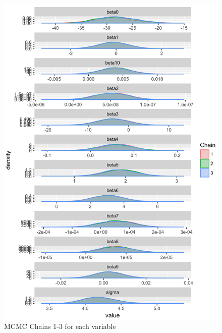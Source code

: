 \documentclass[12pt,english]{article}
\begin{document}
\begin{figure}[h]
\caption{MCMC Chains 1-3 for each variable }
\includegraphics[scale=0.5]{Chains.png}
\centering
\end{figure}
\end{document}
